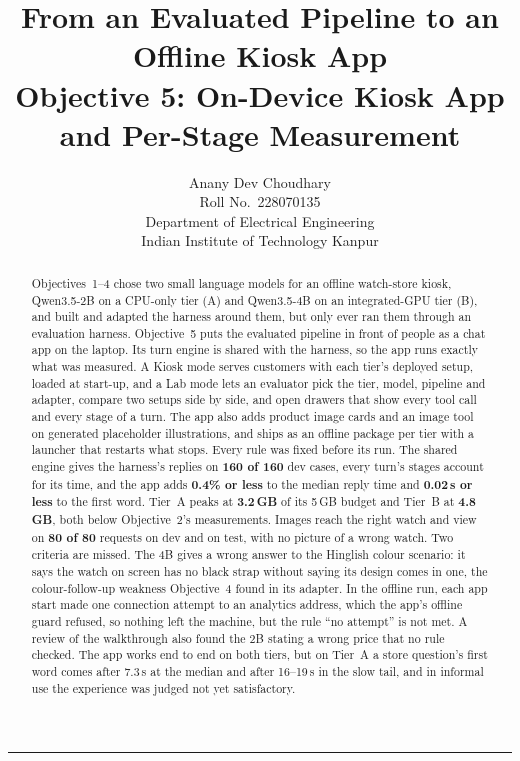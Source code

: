 \documentclass[11pt,a4paper]{article}
\title{\textbf{From an Evaluated Pipeline to an Offline Kiosk App}\\[4pt]
\large Objective 5: On-Device Kiosk App and Per-Stage Measurement}
\author{Anany Dev Choudhary\\\small Roll No.\ 228070135\\\small Department of Electrical Engineering\\\small Indian
Institute of Technology Kanpur}
\date{\reportdate}
\begin{document}
\maketitle

\begin{abstract}
\noindent
Objectives~1--4 chose two small language models for an offline watch-store kiosk, Qwen3.5-2B on a CPU-only tier (A) and
Qwen3.5-4B on an integrated-GPU tier (B), and built and adapted the harness around them, but only ever ran them through
an evaluation harness. Objective~5 puts the evaluated pipeline in front of people as a chat app on the laptop. Its turn
engine is shared with the harness, so the app runs exactly what was measured. A Kiosk mode serves customers with each
tier's deployed setup, loaded at start-up, and a Lab mode lets an evaluator pick the tier, model, pipeline and adapter,
compare two setups side by side, and open drawers that show every tool call and every stage of a turn. The app also adds
product image cards and an image tool on generated placeholder illustrations, and ships as an offline package per tier
with a launcher that restarts what stops. Every rule was fixed before its run. The shared engine gives the harness's
replies on \textbf{160 of 160} dev cases, every turn's stages account for its time, and the app adds \textbf{0.4\% or
less} to the median reply time and \textbf{0.02\,s or less} to the first word. Tier~A peaks at \textbf{3.2\,GB} of its
5\,GB budget and Tier~B at \textbf{4.8\,GB}, both below Objective~2's measurements. Images reach the right watch and
view on \textbf{80 of 80} requests on dev and on test, with no picture of a wrong watch. Two criteria are missed. The
4B gives a wrong answer to the Hinglish colour scenario: it says the watch on screen has no black strap without saying
its design comes in one, the colour-follow-up weakness Objective~4 found in its adapter. In the offline run, each app
start made one connection attempt to an analytics address, which the app's offline guard refused, so nothing left the
machine, but the rule ``no attempt'' is not met. A review of the walkthrough also found the 2B stating a wrong price
that no rule checked. The app works end to end on both tiers, but on Tier~A a store question's first word comes after
7.3\,s at the median and after 16--19\,s in the slow tail, and in informal use the experience was judged not yet
satisfactory.
\end{abstract}

\tableofcontents
\vspace{6pt}
\hrule
\end{document}
